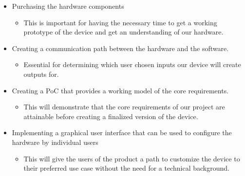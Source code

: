 \documentclass{article}
\begin{document}
\begin{itemize}
	\item Purchasing the hardware components
	\begin{itemize}
		\item This is important for having the necessary time to get a working prototype of the device and get an understanding of our hardware. 
	\end{itemize}
\end{itemize}

\begin{itemize}
	\item Creating a communication path between the hardware and the software.
	\begin{itemize}
		\item Essential for determining which user chosen inputs our device will create outputs for. 
	\end{itemize}
\end{itemize}

\begin{itemize}
	\item Creating a PoC that provides a working model of the core requirements.
	\begin{itemize}
		\item This will demonstrate that the core requirements of our project are attainable before creating a finalized version of the device. 
	\end{itemize}
\end{itemize}

\begin{itemize}
	\item Implementing a graphical user interface that can be used to configure the hardware by individual users  
	\begin{itemize}
		\item This will give the users of the product a path to customize the device to their preferred use case without the need for a technical background. 
	\end{itemize}
\end{itemize}
\end{document}
